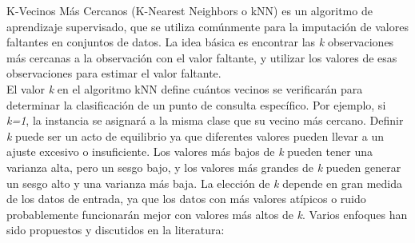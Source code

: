 K-Vecinos Más Cercanos (K-Nearest Neighbors o kNN) es un algoritmo de aprendizaje supervisado, que se utiliza comúnmente para la imputación de valores faltantes en conjuntos de datos. La idea básica es encontrar las \textit{k} observaciones más cercanas a la observación con el valor faltante, y utilizar los valores de esas observaciones para estimar el valor faltante. \\
El valor \textit{k} en el algoritmo kNN define cuántos vecinos se verificarán para determinar la clasificación de un punto de consulta específico. Por ejemplo, si \textit{k=1}, la instancia se asignará a la misma clase que su vecino más cercano. Definir \textit{k} puede ser un acto de equilibrio ya que diferentes valores pueden llevar a un ajuste excesivo o insuficiente. Los valores más bajos de \textit{k} pueden tener una varianza alta, pero un sesgo bajo, y los valores más grandes de \textit{k} pueden generar un sesgo alto y una varianza más baja. La elección de \textit{k} depende en gran medida de los datos de entrada, ya que los datos con más valores atípicos o ruido probablemente funcionarán mejor con valores más altos de \textit{k}. Varios enfoques han sido propuestos y discutidos en la literatura:

